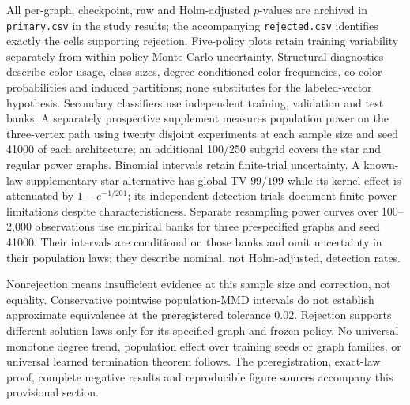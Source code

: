 All per-graph, checkpoint, raw and Holm-adjusted $p$-values are archived in
\texttt{primary.csv} in the study results; the accompanying
\texttt{rejected.csv} identifies exactly the cells supporting rejection.
Five-policy plots retain training variability separately from within-policy
Monte Carlo uncertainty. Structural diagnostics describe color usage,
class sizes, degree-conditioned color frequencies, co-color probabilities
and induced partitions; none substitutes for the labeled-vector hypothesis.
Secondary classifiers use independent training, validation and test banks.
A separately prospective supplement measures population power on the
three-vertex path using twenty disjoint experiments at each sample size and
seed 41000 of each architecture; an additional 100/250 subgrid covers the
star and regular power graphs. Binomial intervals retain finite-trial
uncertainty. A known-law supplementary star alternative has global TV $99/199$ while
its kernel effect is attenuated by $1-e^{-1/201}$; its independent detection
trials document finite-power limitations despite characteristicness.
Separate resampling power curves over 100--2,000 observations use empirical banks
for three prespecified graphs and seed 41000. Their intervals are
conditional on those banks and omit uncertainty in their population laws;
they describe nominal, not Holm-adjusted, detection rates.

Nonrejection means insufficient evidence at this sample size and correction,
not equality. Conservative pointwise population-MMD intervals do not establish
approximate equivalence at the preregistered tolerance $0.02$. Rejection
supports different solution laws only for its specified graph and frozen
policy. No universal monotone degree trend, population effect over training
seeds or graph families, or universal learned termination theorem follows.
The preregistration, exact-law proof, complete negative results and reproducible
figure sources accompany this provisional section.
